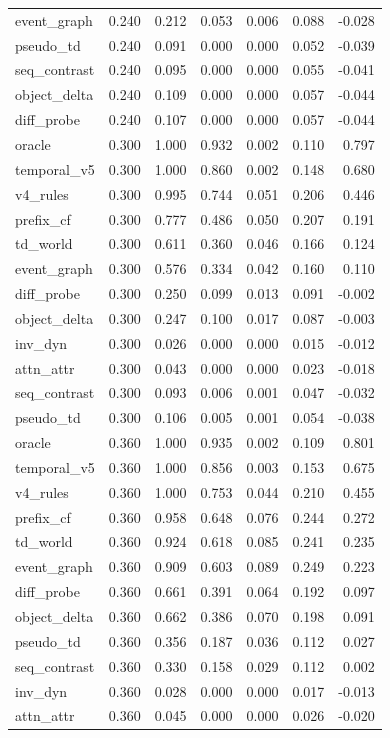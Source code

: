 \documentclass{article}
\begin{document}
\begin{longtable}{@{}lrrrrrr@{}}
event\_graph & 0.240 & 0.212 & 0.053 & 0.006 & 0.088 & -0.028 \\
pseudo\_td & 0.240 & 0.091 & 0.000 & 0.000 & 0.052 & -0.039 \\
seq\_contrast & 0.240 & 0.095 & 0.000 & 0.000 & 0.055 & -0.041 \\
object\_delta & 0.240 & 0.109 & 0.000 & 0.000 & 0.057 & -0.044 \\
diff\_probe & 0.240 & 0.107 & 0.000 & 0.000 & 0.057 & -0.044 \\
oracle & 0.300 & 1.000 & 0.932 & 0.002 & 0.110 & 0.797 \\
temporal\_v5 & 0.300 & 1.000 & 0.860 & 0.002 & 0.148 & 0.680 \\
v4\_rules & 0.300 & 0.995 & 0.744 & 0.051 & 0.206 & 0.446 \\
prefix\_cf & 0.300 & 0.777 & 0.486 & 0.050 & 0.207 & 0.191 \\
td\_world & 0.300 & 0.611 & 0.360 & 0.046 & 0.166 & 0.124 \\
event\_graph & 0.300 & 0.576 & 0.334 & 0.042 & 0.160 & 0.110 \\
diff\_probe & 0.300 & 0.250 & 0.099 & 0.013 & 0.091 & -0.002 \\
object\_delta & 0.300 & 0.247 & 0.100 & 0.017 & 0.087 & -0.003 \\
inv\_dyn & 0.300 & 0.026 & 0.000 & 0.000 & 0.015 & -0.012 \\
attn\_attr & 0.300 & 0.043 & 0.000 & 0.000 & 0.023 & -0.018 \\
seq\_contrast & 0.300 & 0.093 & 0.006 & 0.001 & 0.047 & -0.032 \\
pseudo\_td & 0.300 & 0.106 & 0.005 & 0.001 & 0.054 & -0.038 \\
oracle & 0.360 & 1.000 & 0.935 & 0.002 & 0.109 & 0.801 \\
temporal\_v5 & 0.360 & 1.000 & 0.856 & 0.003 & 0.153 & 0.675 \\
v4\_rules & 0.360 & 1.000 & 0.753 & 0.044 & 0.210 & 0.455 \\
prefix\_cf & 0.360 & 0.958 & 0.648 & 0.076 & 0.244 & 0.272 \\
td\_world & 0.360 & 0.924 & 0.618 & 0.085 & 0.241 & 0.235 \\
event\_graph & 0.360 & 0.909 & 0.603 & 0.089 & 0.249 & 0.223 \\
diff\_probe & 0.360 & 0.661 & 0.391 & 0.064 & 0.192 & 0.097 \\
object\_delta & 0.360 & 0.662 & 0.386 & 0.070 & 0.198 & 0.091 \\
pseudo\_td & 0.360 & 0.356 & 0.187 & 0.036 & 0.112 & 0.027 \\
seq\_contrast & 0.360 & 0.330 & 0.158 & 0.029 & 0.112 & 0.002 \\
inv\_dyn & 0.360 & 0.028 & 0.000 & 0.000 & 0.017 & -0.013 \\
attn\_attr & 0.360 & 0.045 & 0.000 & 0.000 & 0.026 & -0.020 \\
\bottomrule
\end{longtable}
\end{document}

